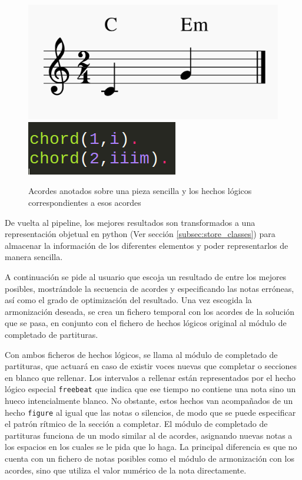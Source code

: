 \begin{figure}[h]
	\centering
	\includegraphics[width=0.4\linewidth]{imagenes/harmonized_example.png}
	\includegraphics[width=0.4\linewidth]{imagenes/chord_facts.png}
	\caption{Acordes anotados sobre una pieza sencilla y los hechos lógicos correspondientes a esos acordes}
	\label{fig:simple-piece-chords}
\end{figure}

De vuelta al pipeline, los mejores resultados son transformados a una representación objetual en python (Ver sección \ref{subsec:store_classes}) para almacenar la información de los diferentes elementos y poder representarlos de manera sencilla. 

A continuación se pide al usuario que escoja un resultado de entre los mejores posibles, mostrándole la secuencia de acordes y especificando las notas erróneas, así como el grado de optimización del resultado. Una vez escogida la armonización deseada, se crea un fichero temporal con los acordes de la solución que se pasa, en conjunto con el fichero de hechos lógicos original al módulo de completado de partituras.

Con ambos ficheros de hechos lógicos, se llama al módulo de completado de partituras, que actuará en caso de existir voces nuevas que completar o secciones en blanco que rellenar. Los intervalos a rellenar están representados por el hecho lógico especial \texttt{freebeat} que indica que ese tiempo no contiene una nota sino un hueco intencialmente blanco. No obstante, estos hechos van acompañados de un hecho \texttt{figure} al igual que las notas o silencios, de modo que se puede especificar el patrón rítmico de la sección a completar.
El módulo de completado de partituras funciona de un modo similar al de acordes, asignando nuevas notas a los espacios en los cuales se le pida que lo haga. La principal diferencia es que no cuenta con un fichero de notas posibles como el módulo de armonización con los acordes, sino que utiliza el valor numérico de la nota directamente. 

